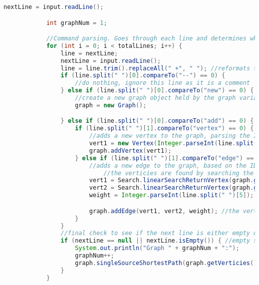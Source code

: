 \documentclass[letterpaper, 10pt,DIV=13]{scrartcl}
\numberwithin{equation}{section} %
\numberwithin{figure}{section} %
\numberwithin{table}{section} %
\begin{document}
\begin{lstlisting}[frame=single, language=java, breaklines]
            nextLine = input.readLine();

            int graphNum = 1;

            //Command parsing. Goes through each line and determines what command is being used based on strings.
            for (int i = 0; i < totalLines; i++) {
                line = nextLine;
                nextLine = input.readLine();
                line = line.trim().replaceAll(" +", " "); //reformats the String so that parsing is easier
                if (line.split(" ")[0].compareTo("--") == 0) {
                    //do nothing, ignore this line as it is a comment
                } else if (line.split(" ")[0].compareTo("new") == 0) { //new graph
                    //create a new graph object held by the graph variable
                    graph = new Graph();

                } else if (line.split(" ")[0].compareTo("add") == 0) { //enters add vertex/add edge tree
                    if (line.split(" ")[1].compareTo("vertex") == 0) { //add vertex x
                        //adds a new vertex to the graph, parsing the ID from the line given
                        vert1 = new Vertex(Integer.parseInt(line.split(" ")[2]));
                        graph.addVertex(vert1);
                    } else if (line.split(" ")[1].compareTo("edge") == 0) { //add edge x -> y with weight z
                        //adds a new edge to the graph, based on the IDs parsed from the line
                            //the verticies are found by searching the graph's verticies ArrayList for a Vertex that matches the ID given in the line at both positions
                        vert1 = Search.linearSearchReturnVertex(graph.getVerticies(), Integer.parseInt(line.split(" ")[2]));
                        vert2 = Search.linearSearchReturnVertex(graph.getVerticies(), Integer.parseInt((line).split(" ")[4]));
                        weight = Integer.parseInt(line.split(" ")[5]);

                        graph.addEdge(vert1, vert2, weight); //the verticies are now added as neighbors, forming an adjacency
                    }
                }
                //final check to see if the next line is either empty or does not exist 
                if (nextLine == null || nextLine.isEmpty()) { //empty space; commands for this graph are done, begin processing
                    System.out.println("Graph " + graphNum + ":");
                    graphNum++;
                    graph.singleSourceShortestPath(graph.getVerticies().get(0));
                }
            }


\end{lstlisting}
\end{document}
